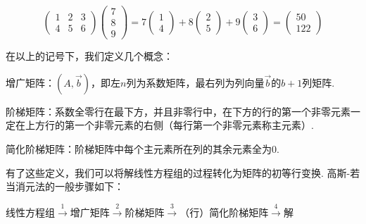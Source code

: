 \[
    \begin{pmatrix}
        1 & 2 & 3 \\ 4 & 5 & 6
    \end{pmatrix} \begin{pmatrix}
        7 \\ 8 \\ 9
    \end{pmatrix} = 7 \begin{pmatrix}
        1 \\ 4
    \end{pmatrix} + 8 \begin{pmatrix}
        2 \\ 5
    \end{pmatrix} + 9 \begin{pmatrix}
        3 \\ 6
    \end{pmatrix} = \begin{pmatrix}
        50 \\ 122
    \end{pmatrix}
\]

在以上的记号下，我们定义几个概念：

增广矩阵：$(A,\vec{b})$，即左$n$列为系数矩阵，最右列为列向量$\vec{b}$的$b+1$列矩阵.

阶梯矩阵：系数全零行在最下方，并且非零行中，在下方的行的第一个非零元素一定在上方行的第一个非零元素的右侧（每行第一个非零元素称主元素）.

简化阶梯矩阵：阶梯矩阵中每个主元素所在列的其余元素全为$0$.

有了这些定义，我们可以将解线性方程组的过程转化为矩阵的初等行变换. 高斯-若当消元法的一般步骤如下：
\begin{center}
    线性方程组$\overset{1}{\longrightarrow}$增广矩阵$\overset{2}{\longrightarrow}$阶梯矩阵$\overset{3}{\longrightarrow}$（行）简化阶梯矩阵$\overset{4}{\longrightarrow}$解
\end{center}

